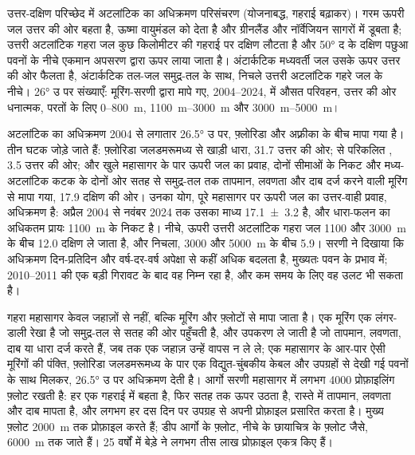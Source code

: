 \begin{omfigure}
{\small उत्तर-दक्षिण परिच्छेद में अटलांटिक का अधिक्रमण परिसंचरण (योजनाबद्ध, गहराई बढ़ाकर)। गरम ऊपरी जल उत्तर की ओर बहता है, ऊष्मा वायुमंडल को देता है और ग्रीनलैंड और नॉर्वेजियन सागरों में डूबता है; उत्तरी अटलांटिक गहरा जल कुछ किलोमीटर की गहराई पर दक्षिण लौटता है और \ang{50} द के दक्षिण पछुआ पवनों के नीचे एकमान अपसरण द्वारा ऊपर लाया जाता है। अंटार्कटिक मध्यवर्ती जल उसके ऊपर उत्तर की ओर फैलता है, अंटार्कटिक तल-जल समुद्र-तल के साथ, निचले उत्तरी अटलांटिक गहरे जल के नीचे। \ang{26} उ पर संख्याएँ: मूरिंग-सरणी द्वारा मापे गए, 2004--2024,  में औसत परिवहन, उत्तर की ओर धनात्मक, परतों के लिए 0--\qty{800}{m}, \qtyrange{1100}{3000}{m} और \qtyrange{3000}{5000}{m}।}
\label{fig:b1:ocean-circulation:moc}
\end{omfigure}

अटलांटिक का अधिक्रमण 2004 से लगातार \ang{26.5} उ पर, फ़्लोरिडा और अफ़्रीका के बीच मापा गया है। तीन घटक जोड़े जाते हैं: फ़्लोरिडा जलडमरूमध्य से खाड़ी धारा, \qty{31.7}{\sverdrup} उत्तर की ओर;  से परिकलित , \qty{3.5}{\sverdrup} उत्तर की ओर; और खुले महासागर के पार ऊपरी जल का प्रवाह, दोनों सीमाओं के निकट और मध्य-अटलांटिक कटक के दोनों ओर सतह से समुद्र-तल तक तापमान, लवणता और दाब दर्ज करने वाली मूरिंग से मापा गया, \qty{17.9}{\sverdrup} दक्षिण की ओर। उनका योग, पूरे महासागर पर ऊपरी जल का उत्तर-वाही प्रवाह, अधिक्रमण है: अप्रैल 2004 से नवंबर 2024 तक उसका माध्य \qty[uncertainty-mode=separate]{17.1 \pm 3.2}{\sverdrup} है, और धारा-फलन का अधिकतम प्रायः \qty{1100}{m} के निकट है। नीचे, ऊपरी उत्तरी अटलांटिक गहरा जल 1100 और \qty{3000}{m} के बीच \qty{12.0}{\sverdrup} दक्षिण ले जाता है, और निचला, 3000 और \qty{5000}{m} के बीच \qty{5.9}{\sverdrup}। सरणी ने दिखाया कि अधिक्रमण दिन-प्रतिदिन और वर्ष-दर-वर्ष अपेक्षा से कहीं अधिक बदलता है, मुख्यतः पवन के प्रभाव में; 2010--2011 की एक बड़ी गिरावट के बाद वह निम्न रहा है, और कम समय के लिए वह उलट भी सकता है।

\begin{inthelab}[गहरे महासागर का मापन]
गहरा महासागर केवल जहाज़ों से नहीं, बल्कि मूरिंग और फ़्लोटों से मापा जाता है। एक मूरिंग एक लंगर-डाली रेखा है जो समुद्र-तल से सतह की ओर पहुँचती है, और उपकरण ले जाती है जो तापमान, लवणता, दाब या धारा दर्ज करते हैं, जब तक एक जहाज़ उन्हें वापस न ले ले; एक महासागर के आर-पार ऐसी मूरिंगों की पंक्ति, फ़्लोरिडा जलडमरूमध्य के पार एक विद्युत-चुंबकीय केबल और उपग्रहों से देखी गई पवनों के साथ मिलकर, \ang{26.5} उ पर अधिक्रमण देती है। आर्गो सरणी महासागर में लगभग \num{4000} प्रोफ़ाइलिंग फ़्लोट रखती है: हर एक गहराई में बहता है, फिर सतह तक ऊपर उठता है, रास्ते में तापमान, लवणता और दाब मापता है, और लगभग हर दस दिन पर उपग्रह से अपनी प्रोफ़ाइल प्रसारित करता है। मुख्य फ़्लोट \qty{2000}{m} तक प्रोफ़ाइल करते हैं; डीप आर्गो के फ़्लोट, नीचे के छायाचित्र के फ़्लोट जैसे, \qty{6000}{m} तक जाते हैं। 25 वर्षों में बेड़े ने लगभग तीस लाख प्रोफ़ाइल एकत्र किए हैं।
\end{inthelab}

